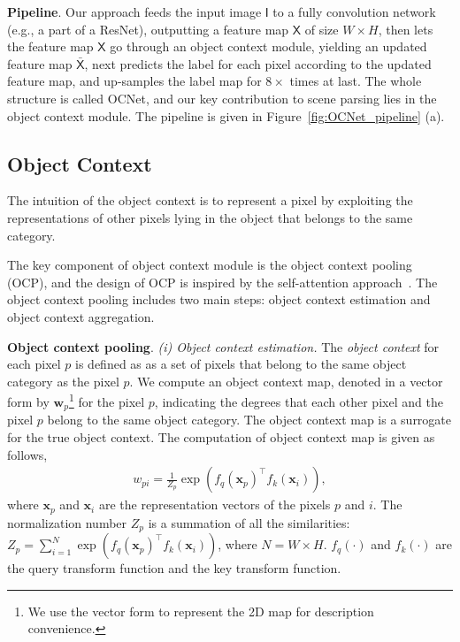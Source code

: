 \documentclass[10pt,twocolumn,letterpaper]{article}
\begin{document}
\vspace{.1cm}
\noindent\textbf{Pipeline}.
Our approach feeds the input image $\mathsf{I}$
to a fully convolution network (e.g., a part of a ResNet),
outputting a feature map $\mathsf{X}$ of size $ W\times H$,
then lets the feature map $\mathsf{X}$ go through an object context module,
yielding an updated feature map $\bar{\mathsf{X}}$,
next predicts the label for each pixel according to the updated feature map, 
and up-samples the label map for $8 \times$ times at last.
The whole structure is called OCNet, 
and our key contribution to scene parsing
lies in the object context module.
The pipeline is given 
in Figure~\ref{fig:OCNet_pipeline} (a).

\subsection{Object Context}
The intuition of the object context 
is to represent a pixel
by exploiting the representations of other pixels 
lying in the object that belongs to the same category.

The key component of object context module is the object context pooling (OCP),
and the design of OCP is inspired
by the self-attention approach~\cite{lin2017structured, vaswani2017attention}.
The object context pooling includes two main steps:
object context estimation and
object context aggregation.


\vspace{.1cm}
\noindent\textbf{Object context pooling}.
\noindent\emph{(i) Object context estimation.}
The \emph{object context} for each pixel $p$
is defined as 
as a set of pixels 
that belong to the same object category
as the pixel $p$.
We compute an object context map, denoted in a vector form by $\mathbf{w}_p$\footnote{We use the vector form to represent the 2D map for description convenience.}
for the pixel $p$,
indicating the degrees that each other pixel and the pixel $p$ belong to the same object category.
The object context map is a surrogate for the true object context.
The computation of object context map is given as follows,
\begin{align}
w_{pi} =\frac{1}{Z_p} \exp(f_q(\mathbf{x}_p)^\top f_k(\mathbf{x}_i)),
\end{align}
where $\mathbf{x}_p$ and $\mathbf{x}_i$ are the representation vectors
of the pixels $p$ and $i$.
The normalization number $Z_p$ is a summation of all the similarities:
$Z_p = \sum_{i=1}^N \exp(f_q(\mathbf{x}_p)^\top f_k(\mathbf{x}_i))$,
where $N = W \times H$.
$f_q(\cdot)$ and $f_k(\cdot)$ are the query transform function and the key transform function.
\end{document}
